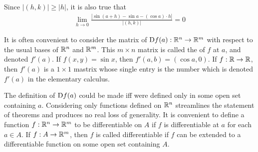 Since $|(h, k)| \ge |h|$, it is also true that 
\begin{align*}
    \lim_{h\to 0}{\frac{|\sin(a+h) - \sin a - (\cos a)\cdot h|}{|(h, k)|}} = 0
\end{align*}

It is often convenient to consider the matrix of $\mathrm{D}f(a): \mathbb{R}^n\to \mathbb{R}^m$ 
with respect to the usual bases of $\mathbb{R}^n$ and $\mathbb{R}^m$. This $m\times n$ 
matrix is called the  of $f$ at $a$, and denoted $f'(a)$.
If $f(x, y) = \sin x$, then $f'(a, b) = (\cos a, 0)$. If $f:\mathbb{R}\to \mathbb{R}$, then 
$f'(a)$ is a $1\times 1$ mastrix whose single entry is the number which is denoted
$f'(a)$ in the elementary calculus.

The definition of $\mathrm{D}f(a)$ could be made iff were defined only
in some open set containing $a$. Considering only functions
defined on $\mathbb{R}^n$ streamlines the statement of theorems and
produces no real loss of generality. It is convenient to define
a function $f:\mathbb{R}^n\to \mathbb{R}^m$ to be differentiable on $A$ if $f$ 
is differentiable at $a$ for each $a\in A$. If $f:A \to \mathbb{R}^m$, 
then $f$ is called differentiable if $f$ can be extended to a 
differentiable function on some open set containing $A$.

